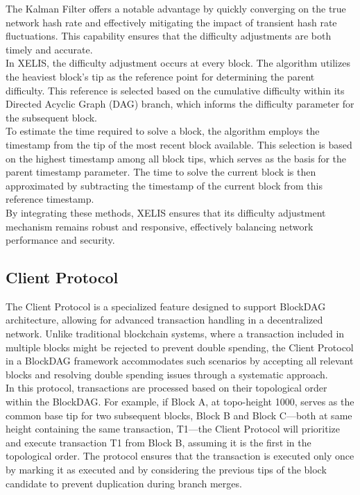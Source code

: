 \documentclass[10pt,a4paper,twocolumn]{article}
\begin{document}
The Kalman Filter offers a notable advantage by quickly converging on the true network hash rate and effectively mitigating the impact of transient hash rate fluctuations. This capability ensures that the difficulty adjustments are both timely and accurate.\\

In XELIS, the difficulty adjustment occurs at every block. The algorithm utilizes the heaviest block’s tip as the reference point for determining the parent difficulty. This reference is selected based on the cumulative difficulty within its Directed Acyclic Graph (DAG) branch, which informs the difficulty parameter for the subsequent block.\\

To estimate the time required to solve a block, the algorithm employs the timestamp from the tip of the most recent block available. This selection is based on the highest timestamp among all block tips, which serves as the basis for the parent timestamp parameter. The time to solve the current block is then approximated by subtracting the timestamp of the current block from this reference timestamp.\\

By integrating these methods, XELIS ensures that its difficulty adjustment mechanism remains robust and responsive, effectively balancing network performance and security.

\subsection{Client Protocol}

The Client Protocol is a specialized feature designed to support BlockDAG architecture, allowing for advanced transaction handling in a decentralized network. Unlike traditional blockchain systems, where a transaction included in multiple blocks might be rejected to prevent double spending, the Client Protocol in a BlockDAG framework accommodates such scenarios by accepting all relevant blocks and resolving double spending issues through a systematic approach.\\

In this protocol, transactions are processed based on their topological order within the BlockDAG. For example, if Block A, at topo-height 1000, serves as the common base tip for two subsequent blocks, Block B and Block C—both at same height containing the same transaction, T1—the Client Protocol will prioritize and execute transaction T1 from Block B, assuming it is the first in the topological order. The protocol ensures that the transaction is executed only once by marking it as executed and by considering the previous tips of the block candidate to prevent duplication during branch merges.\\
\end{document}
